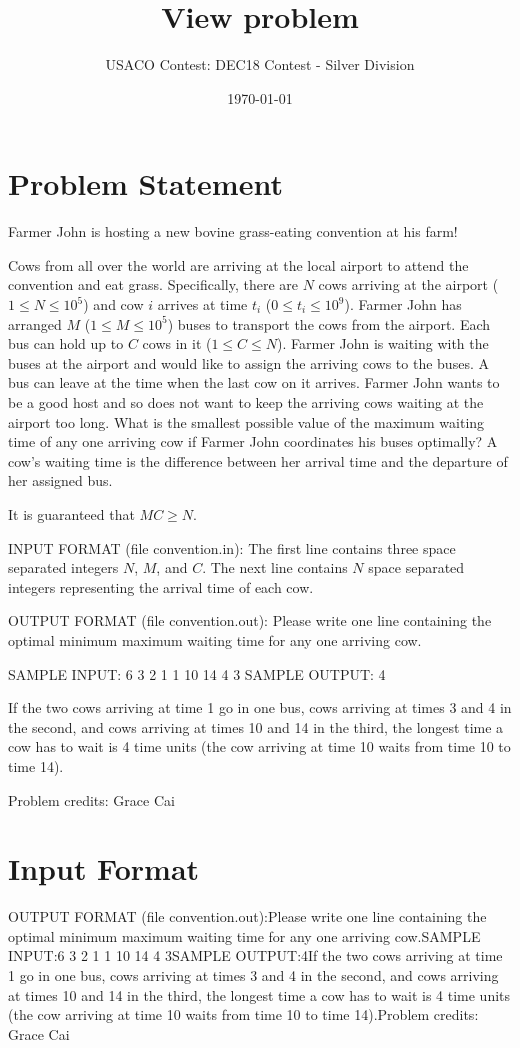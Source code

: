 \documentclass[12pt]{article}
\title{View problem}
\author{USACO Contest: DEC18 Contest - Silver Division}
\date{\today}
\begin{document}
\maketitle

\section*{Problem Statement}

Farmer John is hosting a new bovine grass-eating convention at his farm!

Cows from all over the world are arriving at the local airport to attend the
convention and eat grass. Specifically, there are $N$ cows arriving at the
airport ($1 \leq N \leq 10^5$) and cow $i$ arrives at time $t_i$
($0 \leq t_i \leq 10^9$). Farmer John has arranged $M$ ($1 \leq M \leq 10^5$)
buses to transport the cows from the airport. Each bus can hold up to $C$
cows in it ($1 \leq C \leq N$). Farmer John is waiting with the buses at the
airport and would like to assign the arriving cows to the buses. A bus can leave
at the time when the last cow on it arrives. Farmer John wants to be a good host
and so does not want to keep the arriving cows waiting at the airport too long.
What is the smallest  possible value of the maximum waiting time of any one
arriving cow if Farmer John coordinates his buses optimally? A cow’s waiting
time is the difference between her arrival time and the departure of her
assigned bus.

It is guaranteed that $MC \geq N$.

INPUT FORMAT (file convention.in):
The first line contains three space separated integers $N$, $M$, and $C$. The
next line contains $N$ space separated integers representing the arrival time of
each cow.

OUTPUT FORMAT (file convention.out):
Please write one line containing the optimal minimum maximum waiting time for
any one arriving cow.

SAMPLE INPUT:
6 3 2
1 1 10 14 4 3
SAMPLE OUTPUT: 
4

If the two cows arriving at time 1 go in one bus, cows arriving at times 3 and 4
in the second, and cows arriving at times 10 and 14 in the third, the longest
time a cow has to wait is 4 time units (the cow arriving at time 10 waits from
time 10 to time 14).


Problem credits: Grace Cai



\section*{Input Format}
OUTPUT FORMAT (file convention.out):Please write one line containing the optimal minimum maximum waiting time for
any one arriving cow.SAMPLE INPUT:6 3 2
1 1 10 14 4 3SAMPLE OUTPUT:4If the two cows arriving at time 1 go in one bus, cows arriving at times 3 and 4
in the second, and cows arriving at times 10 and 14 in the third, the longest
time a cow has to wait is 4 time units (the cow arriving at time 10 waits from
time 10 to time 14).Problem credits: Grace Cai
\end{document}
